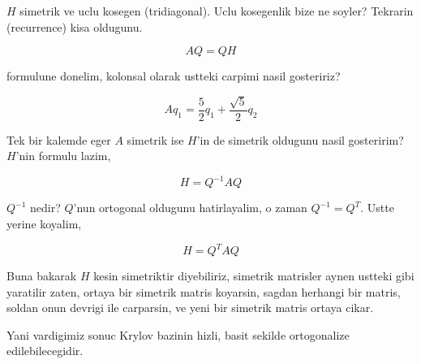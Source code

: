 \documentclass[12pt,fleqn]{article}\usepackage{../common}
\begin{document}
$H$ simetrik ve uclu kosegen (tridiagonal). Uclu kosegenlik bize ne
soyler?  Tekrarin (recurrence) kisa oldugunu.

\[ AQ = QH \]

formulune donelim, kolonsal olarak ustteki carpimi nasil gosteririz? 

\[ Aq_1  = \frac{ 5}{2}q_1  + \frac{ \sqrt{ 5}}{2} q_2 \]

Tek bir kalemde eger $A$ simetrik ise $H$'in de simetrik oldugunu nasil
gosteririm? $H$'nin formulu lazim, 

\[ H = Q^{-1}AQ \]

$Q^{-1}$ nedir? $Q$'nun ortogonal oldugunu hatirlayalim, o zaman 
$Q^{-1} =
Q^T$. Ustte yerine koyalim,

\[ H = Q^{T}AQ \]

Buna bakarak $H$ kesin simetriktir diyebiliriz, simetrik matrisler aynen
ustteki gibi yaratilir zaten, ortaya bir simetrik matris koyarsin, sagdan
herhangi bir matris, soldan onun devrigi ile carparsin, ve yeni bir
simetrik matris ortaya cikar. 

Yani vardigimiz sonuc Krylov bazinin hizli, basit sekilde ortogonalize
edilebilecegidir. 
\end{document}
